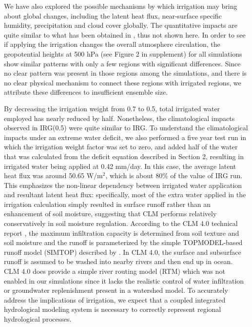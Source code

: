 \documentclass[draft,ms]{agutex}   %
\begin{document}
\begin{article}
We have also explored the possible mechanisms by which irrigation may bring about global changes, including the latent heat flux, near-surface specific humidity, precipitation and cloud cover globally. The quantitative impacts are quite similar to what has been obtained in \cite{sacks2009effects}, thus not shown here. In order to see if applying the irrigation changes the overall atmosphere circulation, the geopotential heights at 500 hPa (see Figure 2 in supplement) for all simulations show similar patterns with only a few regions with significant differences. Since no clear pattern was present in those regions among the simulations, and there is no clear physical mechanism to connect these regions with irrigated regions, we attribute these differences to insufficient ensemble size.


By decreasing the irrigation weight from 0.7 to 0.5, total irrigated water employed has nearly reduced by half. Nonetheless, the climatological impacts observed in IRG(0.5) were quite similar to IRG. To understand the climatological impacts under an extreme water deficit, we also performed a five year test run in which the irrigation weight factor was set to zero, and added half of the water that was calculated from the deficit equation described in Section 2, resulting in irrigated water being applied at 0.42 mm/day. In this case, the average latent heat flux was around 50.65 W$/$m$^2$, which is about 80$\%$ of the value of IRG run.  This emphasizes the non-linear dependency between irrigated water application and resultant latent heat flux: specifically, most of the extra water applied in the irrigation calculation simply resulted in surface runoff rather than an enhancement of soil moisture, suggesting that CLM performs relatively conservatively in soil moisture regulation. According to the CLM 4.0 technical report \citep{CLM40Tech}, the maximum infiltration capacity is determined from soil texture and soil moisture \citep{entekhabi1989land} and the runoff is parameterized by the simple TOPMODEL-based \citep{beven1979physically} runoff model (SIMTOP) described by \cite{niu2005simple}. In CLM 4.0, the surface and subsurface runoff is assumed to be washed into nearby rivers and then end up in ocean.  CLM 4.0 does provide a simple river routing model (RTM) which was not enabled in our simulations since it lacks the realistic control of water infiltration or groundwater replenishment present in a watershed model. To accurately address the implications of irrigation, we expect that a coupled integrated hydrological modeling system is necessary to correctly represent regional hydrological processes.




\end{article}
\end{document}

